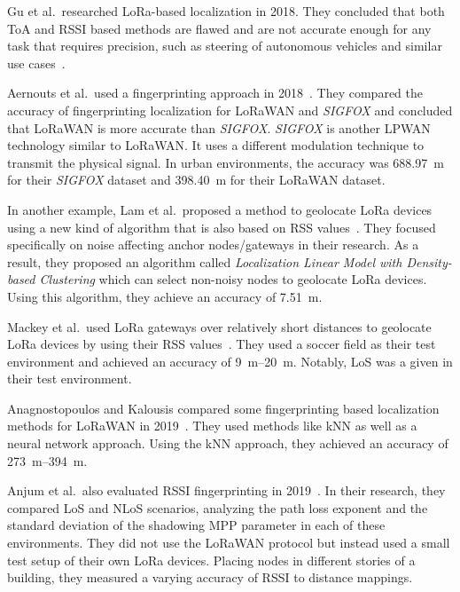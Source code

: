 Gu et al.\ researched \ac{LoRa}-based localization in 2018.
They concluded that both \ac{ToA} and \ac{RSSI} based methods are flawed and are not accurate enough for any task that requires precision, such as steering of autonomous vehicles and similar use cases~\cite{gu_lora-based_2018}.

Aernouts et al.\ used a fingerprinting approach in 2018~\cite{aernouts_sigfox_2018}.
They compared the accuracy of fingerprinting localization for \ac{LoRaWAN} and \emph{SIGFOX} and concluded that \ac{LoRaWAN} is more accurate than \emph{SIGFOX}.
\emph{SIGFOX} is another \ac{LPWAN} technology similar to \ac{LoRaWAN}.
It uses a different modulation technique to transmit the physical signal.
In urban environments, the accuracy was \SI{688.97}{\meter} for their \emph{SIGFOX} dataset and \SI{398.40}{\meter} for their LoRaWAN dataset.

In another example, Lam et al.~proposed a method to geolocate \ac{LoRa} devices using a new kind of algorithm that is also based on \ac{RSS} values~\cite{lam_new_2018}.
They focused specifically on noise affecting anchor nodes/gateways in their research.
As a result, they proposed an algorithm called \emph{Localization Linear Model with Density-based Clustering} which can select non-noisy nodes to geolocate \ac{LoRa} devices.
Using this algorithm, they achieve an accuracy of \SI{7.51}{\meter}.

Mackey et al.~used \ac{LoRa} gateways over relatively short distances to geolocate \ac{LoRa} devices by using their \ac{RSS} values~\cite{mackey_lora-based_2019}.
They used a soccer field as their test environment and achieved an accuracy of \SIrange{9}{20}{\meter}.
Notably, \ac{LoS} was a given in their test environment.

Anagnostopoulos and Kalousis compared some fingerprinting based localization methods for \ac{LoRaWAN} in 2019~\cite{anagnostopoulos_reproducible_2019}.
They used methods like \ac{kNN} as well as a neural network approach.
Using the \ac{kNN} approach, they achieved an accuracy of \SIrange{273}{394}{\meter}.

Anjum et al.\ also evaluated \ac{RSSI} fingerprinting in 2019~\cite{anjum_analysis_2019}.
In their research, they compared \ac{LoS} and \ac{NLoS} scenarios, analyzing the path loss exponent and the standard deviation of the shadowing \ac{MPP} parameter in each of these environments.
They did not use the \ac{LoRaWAN} protocol but instead used a small test setup of their own \ac{LoRa} devices.
Placing nodes in different stories of a building, they measured a varying accuracy of \ac{RSSI} to distance mappings.

